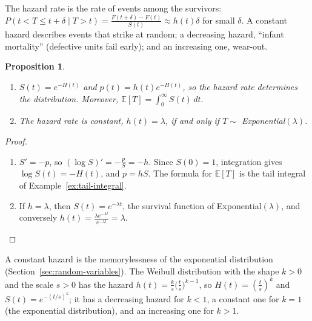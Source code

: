 \documentclass[11pt]{article}
\newcommand{\E}{\mathbb{E}}
\theoremstyle{definition}
\theoremstyle{plain}
\newtheorem{proposition}[definition]{Proposition}
\theoremstyle{remark}
\begin{document}
The hazard rate is the rate of events among the survivors: $P(t < T \leq t + \delta \mid T > t) = \frac{F(t + \delta) - F(t)}{S(t)} \approx h(t)\delta$ for small $\delta$. A constant hazard describes events that strike at random; a decreasing hazard, ``infant mortality'' (defective units fail early); and an increasing one, wear-out.

\begin{proposition}\label{prop:hazard}
    \begin{enumerate}
        \item $S(t) = e^{-H(t)}$ and $p(t) = h(t)e^{-H(t)}$, so the hazard rate determines the distribution. Moreover, $\E[T] = \int_0^\infty S(t)\, dt$.
        \item The hazard rate is constant, $h(t) = \lambda$, if and only if $T \sim$ Exponential$(\lambda)$.
    \end{enumerate}
\end{proposition}

\begin{proof}
    \begin{enumerate}
        \item $S' = -p$, so $(\log S)' = -\frac{p}{S} = -h$. Since $S(0) = 1$, integration gives $\log S(t) = -H(t)$, and $p = hS$. The formula for $\E[T]$ is the tail integral of Example~\ref{ex:tail-integral}.
        \item If $h = \lambda$, then $S(t) = e^{-\lambda t}$, the survival function of Exponential$(\lambda)$, and conversely $h(t) = \frac{\lambda e^{-\lambda t}}{e^{-\lambda t}} = \lambda$. \qedhere
    \end{enumerate}
\end{proof}

A constant hazard is the memorylessness of the exponential distribution (Section~\ref{sec:random-variables}). The Weibull distribution with the shape $k > 0$ and the scale $s > 0$ has the hazard $h(t) = \frac{k}{s}\big(\frac{t}{s}\big)^{k-1}$, so $H(t) = (\frac{t}{s})^k$ and $S(t) = e^{-(t/s)^k}$; it has a decreasing hazard for $k < 1$, a constant one for $k = 1$ (the exponential distribution), and an increasing one for $k > 1$.
\end{document}
